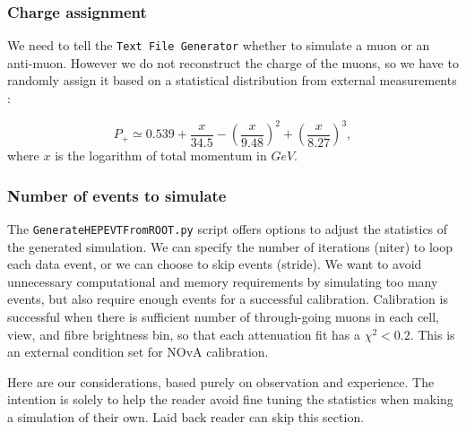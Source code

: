 \subsubsection*{Charge assignment}
We need to tell the \texttt{Text File Generator} whether to simulate a muon or an anti-muon. However we do not reconstruct the charge of the muons, so we have to randomly assign it based on a statistical distribution from external measurements \cite{NOVA-doc-51327-v3}:


\begin{equation}
P_+ \simeq 0.539 + \frac{x}{34.5}-\left(\frac{x}{9.48}\right)^2 + \left(\frac{x}{8.27}\right)^3,
\end{equation}
where $x$ is the logarithm of total momentum in $\unit{GeV}$.

\subsubsection*{Number of events to simulate}\label{secNumEvents}
The \texttt{GenerateHEPEVTFromROOT.py} script offers options to adjust the statistics of the generated simulation. We can specify the number of iterations (niter) to loop each data event, or we can choose to skip events (stride). We want to avoid unnecessary computational and memory requirements by simulating too many events, but also require enough events for a successful calibration. Calibration is successful when there is sufficient number of through-going muons in each cell, view, and fibre brightness bin, so that each attenuation fit has a $\chi^2<0.2$. This is an external condition set for NOvA calibration.

Here are our considerations, based purely on observation and experience. The intention is solely to help the reader avoid fine tuning the statistics when making a simulation of their own. Laid back reader can skip this section.

